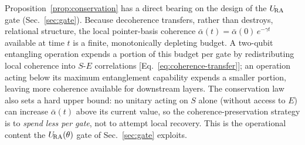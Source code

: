 \begin{remark}
Proposition~\ref{prop:conservation} has a direct bearing on the
design of the $U_{\!\mathrm{RA}}$ gate (Sec.~\ref{sec:gate}).
Because decoherence transfers, rather than destroys, relational
structure, the local pointer-basis coherence
$\bar{\alpha}(t) = \bar{\alpha}(0)\,e^{-\gamma t}$ available at time $t$
is a finite, monotonically depleting budget.
A two-qubit entangling operation expends a portion of this budget per
gate by redistributing local coherence into $S$-$E$ correlations
[Eq.~\eqref{eq:coherence-transfer}]; an operation acting below its
maximum entanglement capability expends a smaller portion, leaving more
coherence available for downstream layers.
The conservation law also sets a hard upper bound: no unitary acting on
$S$ alone (without access to $E$) can increase $\bar{\alpha}(t)$ above
its current value, so the coherence-preservation strategy is to
\emph{spend less per gate}, not to attempt local recovery.
This is the operational content the $U_{\!\mathrm{RA}}(\theta)$ gate of
Sec.~\ref{sec:gate} exploits.
\end{remark}
